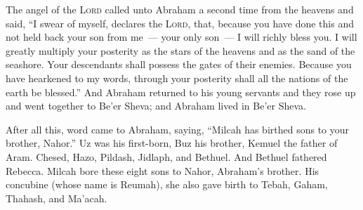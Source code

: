 \begin{inparaenum}
   The angel of the \textsc{Lord} called unto Abraham a second time from the heavens%
   and said, ``I swear of myself, declares the \textsc{Lord}, that, because you have done this and not held back your son from me\understood~--- your only son~---%
   I will richly bless you. I will greatly multiply your posterity as the stars of the heavens and as the sand of the seashore. Your descendants shall possess the gates of their enemies.%
   Because you have hearkened to my words, through your posterity shall all the nations of the earth be blessed.''%
   And Abraham returned to his young servants and they rose up and went together to Be'er Sheva; and Abraham lived in Be'er Sheva.%
  
   After all this, word came to Abraham, saying, ``Milcah has birthed sons to your brother, Nahor.''%
   Uz was his first-born, Buz his brother, Kemuel the father of Aram.%
   Chesed, Hazo, Pildash, Jidlaph, and Bethuel.%
   And Bethuel fathered Rebecca. Milcah bore these eight sons to Nahor, Abraham's brother.%
   His concubine (whose name is Reumah), she also gave birth to Tebah, Gaham, Thahash, and Ma'acah.%
\end{inparaenum}
